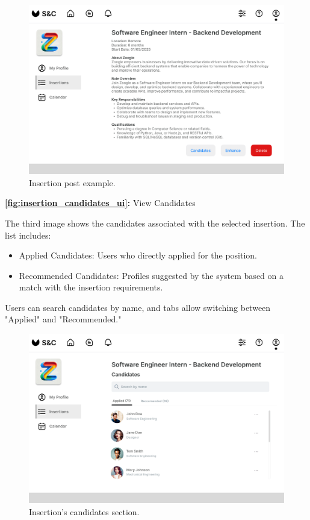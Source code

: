 \begin{figure}[H]
    \centering
    \includegraphics[width=0.75\linewidth]{DD/Images/UI/Insertions_selected.png}
    \caption{Insertion post example.}
    \label{fig:insertion_example_ui}
\end{figure}

\newpage

\textbf{\autoref{fig:insertion_candidates_ui}:} View Candidates

The third image shows the candidates associated with the selected insertion. The list includes:

\begin{itemize}
    \item 
Applied Candidates: Users who directly applied for the position.
    \item 
Recommended Candidates: Profiles suggested by the system based on a match with the insertion requirements.
\end{itemize}

Users can search candidates by name, and tabs allow switching between "Applied" and "Recommended."

\begin{figure}[H]
    \centering
    \includegraphics[width=0.75\linewidth]{DD/Images/UI/Insertions_selected_candidates.png}
    \caption{Insertion's candidates section.}
    \label{fig:insertion_candidates_ui}
\end{figure}

